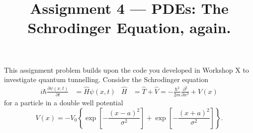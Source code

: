 \documentclass[11pt]{article}
\title{Assignment 4 --- PDEs: The Schrodinger Equation, again. }
\date{}                                           %
\begin{document}
\maketitle
\vspace{-36pt}
This assignment problem builds upon the code you developed in Workshop X  to investigate quantum tunnelling. Consider  the Schrodinger equation
\begin{align}
i \hbar \frac{\partial \psi (x,t)}{\partial t}  &= \hat H  \psi(x,t) & \hat H &= \hat T + \hat V  =   -\tfrac{\hbar^2 }{2m} \tfrac{
\partial^2}{\partial x^2} + V(x)
\end{align}
 for a particle in a double well potential  
\begin{equation}
V(x) = -V_0 \left\{ \exp\left[ -\frac{(x-a)^2}{\sigma^2} \right] + \exp\left[ -\frac{(x+a)^2}{\sigma^2} \right] \right\}.
\end{equation}
\dotfill \\
\end{document}
